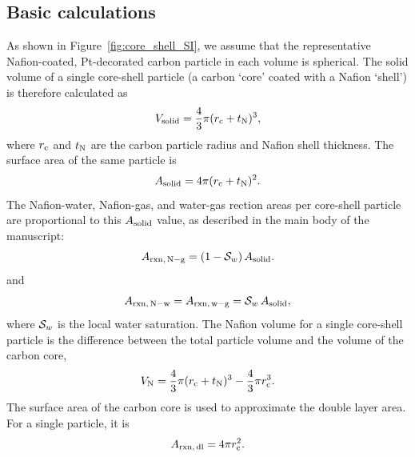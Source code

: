 \documentclass[final,3p,times,onecolumn]{elsarticle}    %
\begin{document}
\subsection{Basic calculations}
As shown in Figure~\ref{fig:core_shell_SI}, we assume that the representative Nafion-coated, Pt-decorated carbon particle in each volume is spherical. The solid volume of a single core-shell particle (a carbon `core' coated with a Nafion `shell') is therefore calculated as
\begin{equation}\label{eq:V_solid}
    V_{\rm solid} = \frac{4}{3} \pi (r_{\rm c} + t_{\rm N})^3,
\end{equation}
where $r_{\rm c}$ and $t_{\rm N}$ are the carbon particle radius and Nafion shell thickness. The surface area of the same particle is
\begin{equation}
    A_{\rm solid} = 4 \pi (r_{\rm c} + t_{\rm N})^2. 
\end{equation}
The Nafion-water, Nafion-gas, and water-gas rection areas per core-shell particle are proportional to this $A_{\rm solid}$ value, as described in the main body of the manuscript:
\begin{equation}
    A_{\rm rxn,\,N-g} = (1-{\cal S}_w)\,A_{\rm solid}.
\end{equation}
and
\begin{equation}
    A_{\rm rxn,\,N-w} =A_{\rm rxn,\,w-g} =  {\cal S}_w\,A_{\rm solid},
\end{equation}
where ${\cal S}_w$ is the local water saturation. The Nafion volume for a single core-shell particle is the difference between the total particle volume and the volume of the carbon core,
\begin{equation}
    V_{\rm N} = \frac{4}{3} \pi (r_{\rm c} + t_{\rm N})^3 - \frac{4}{3} \pi r_{\rm c}^3.
\end{equation}
The surface area of the carbon core is used to approximate the double layer area. For a single particle, it is
\begin{equation}
    A_{\rm rxn,\,dl} = 4 \pi r_{\rm c}^2.
\end{equation}
\end{document}
